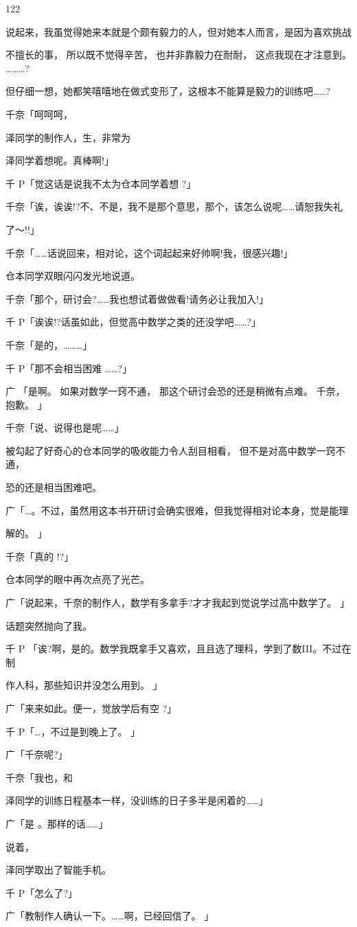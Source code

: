 122\par
说起来，我虽觉得她来本就是个颇有毅力的人，但对她本人而言，是因为喜欢挑战\par
不擅长的事， 所以既不觉得辛苦， 也并非靠毅力在耐耐， 这点我现在才注意到。 ………?\par
但仔细一想，她都笑嘻嘻地在做式变形了，这根本不能算是毅力的训练吧……?\par
千奈「呵呵呵，\par
泽同学的制作人，生，非常为\par
泽同学着想呢。真棒啊!」\par
千 P「觉这话是说我不太为仓本同学着想 ?」\par
千奈「诶，诶诶!?不、不是，我不是那个意思，那个，该怎么说呢……请恕我失礼\par
了～!!」\par
千奈「……话说回来，相对论，这个词起起来好帅啊!我，很感兴趣!」\par
仓本同学双眼闪闪发光地说道。\par
千奈「那个，研讨会?……我也想试着做做看!请务必让我加入!」\par
千 P「诶诶!?话虽如此，但觉高中数学之类的还没学吧……?」\par
千奈「是的，………」\par
千 P「那不会相当困难 ……?」\par
广 「是啊。 如果对数学一窍不通， 那这个研讨会恐的还是稍微有点难。 千奈， 抱歉。 」\par
千奈「说、说得也是呢……」\par
被勾起了好奇心的仓本同学的吸收能力令人刮目相看， 但不是对高中数学一窍不通，\par
恐的还是相当困难吧。\par
广「…。不过，虽然用这本书开研讨会确实很难，但我觉得相对论本身，觉是能理\par
解的。 」\par
千奈「真的 !?」\par
仓本同学的眼中再次点亮了光芒。\par
广「说起来，千奈的制作人，数学有多拿手?才才我起到觉说学过高中数学了。 」\par
话题突然抛向了我。\par
千 P 「诶?啊，是的。数学我既拿手又喜欢，且且选了理科，学到了数III。不过在制\par
作人科，那些知识并没怎么用到。 」\par
广「来来如此。便一，觉放学后有空 ?」\par
千 P「…，不过是到晚上了。 」\par
广「千奈呢?」\par
千奈「我也，和\par
泽同学的训练日程基本一样，没训练的日子多半是闲着的……」\par
广「是 。那样的话……」\par
说着，\par
泽同学取出了智能手机。\par
千 P「怎么了?」\par
广「教制作人确认一下。……啊，已经回信了。 」\par

